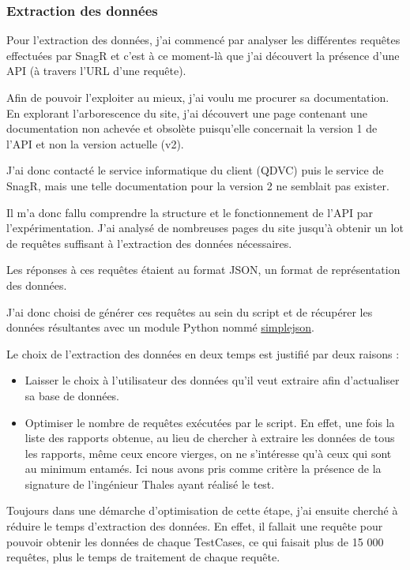 \subsubsection{Extraction des données}

Pour l'extraction des données, j'ai commencé par analyser les différentes requêtes effectuées par \gls{SnagR} et c'est à ce moment-là que j'ai découvert la présence d'une \gls{API} (à travers l'URL d'une requête).

Afin de pouvoir l'exploiter au mieux, j'ai voulu me procurer sa documentation. En explorant l'arborescence du site, j'ai découvert une page contenant une documentation non achevée et obsolète puisqu'elle concernait la version 1 de l'\gls{API} et non la version actuelle (v2).

J'ai donc contacté le service informatique du client (QDVC) puis le service de \gls{SnagR}, mais une telle documentation pour la version 2 ne semblait pas exister.

Il m'a donc fallu comprendre la structure et le fonctionnement de l'\gls{API} par l'expérimentation.
J'ai analysé de nombreuses pages du site jusqu'à obtenir un lot de requêtes suffisant à l'extraction des données nécessaires.

Les réponses à ces requêtes étaient au format JSON, un format de représentation des données.

J'ai donc choisi de générer ces requêtes au sein du script et de récupérer les données résultantes avec un module Python nommé \underline{\href{https://simplejson.readthedocs.io/en/latest/}{simplejson}}.

Le choix de l'extraction des données en deux temps est justifié par deux raisons :
\begin{itemize}
\item Laisser le choix à l'utilisateur des données qu'il veut extraire afin d'actualiser sa base de données.
\item Optimiser le nombre de requêtes exécutées par le script. En effet, une fois la liste des rapports obtenue, au lieu de chercher à extraire les données de tous les rapports, même ceux encore vierges, on ne s'intéresse qu’à ceux qui sont au minimum entamés. Ici nous avons pris comme critère la présence de la signature de l'ingénieur Thales ayant réalisé le test.
\end{itemize}

Toujours dans une démarche d'optimisation de cette étape, j'ai ensuite cherché à réduire le temps d'extraction des données. En effet, il fallait une requête pour pouvoir obtenir les données de chaque \gls{TestCases}, ce qui faisait plus de 15 000 requêtes, plus le temps de traitement de chaque requête.

